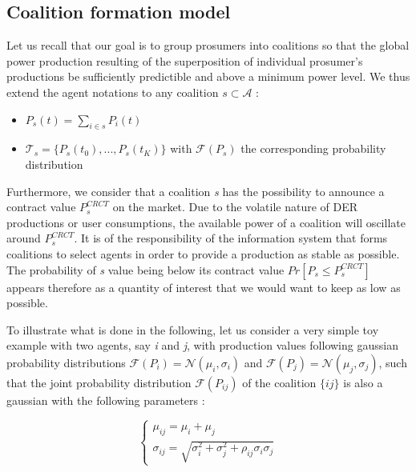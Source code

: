\documentclass[conference]{IEEEtran}
\begin{document}
\subsection{Coalition formation model}\label{subsec:Coalition}

Let us recall that our goal is to group prosumers into coalitions so that the global power production resulting of the superposition of individual prosumer's productions be sufficiently predictible and above a minimum power level. We thus extend the agent notations to any coalition $ s \subset \mathcal{A} $ : 
\begin{itemize}
\item $ P_{s}(t) = \sum_{i \in s} P_{i}(t) $
\item $ \mathcal{T}_{s} = \{ P_{s}(t_{0}),...,P_{s}(t_{K}) \} $ with $ \mathcal{F}(P_{s}) $ the corresponding probability distribution
\end{itemize}

Furthermore, we consider that a coalition \textit{s} has the possibility to announce a contract value $ P_{s}^{CRCT} $ on the market. Due to the volatile nature of DER productions or user consumptions, the available power of a coalition will oscillate around $ P_{s}^{CRCT} $. It is of the responsibility of the information system that forms coalitions to select agents in order to provide a production as stable as possible. The probability of \textit{s} value being below its contract value $ Pr[P_{s} \leq P_{s}^{CRCT} ] $ appears therefore as a quantity of interest that we would want to keep as low as possible. 

To illustrate what is done in the following, let us consider a very simple toy example with two agents, say \textit{i} and \textit{j}, with production values following gaussian probability distributions $ \mathcal{F}(P_{i}) = \mathcal{N}(\mu_{i}, \sigma_{i}) $ and $ \mathcal{F}(P_{j}) = \mathcal{N}(\mu_{j}, \sigma_{j}) $, such that the joint probability distribution  $ \mathcal{F}(P_{ij}) $ of the coalition $\{ij\}$ is also a gaussian with the following parameters :

\begin{equation}
\left\{ \begin{array}{lll}
		\mu_{ij} = \mu_{i} + \mu_{j} \\
		\sigma_{ij} = \sqrt{\sigma_{i}^{2} + \sigma_{j}^{2} + \rho_{ij}\sigma_{i}\sigma_{j}}
\end{array} \right.
\label{parameters}
\end{equation}
\end{document}
